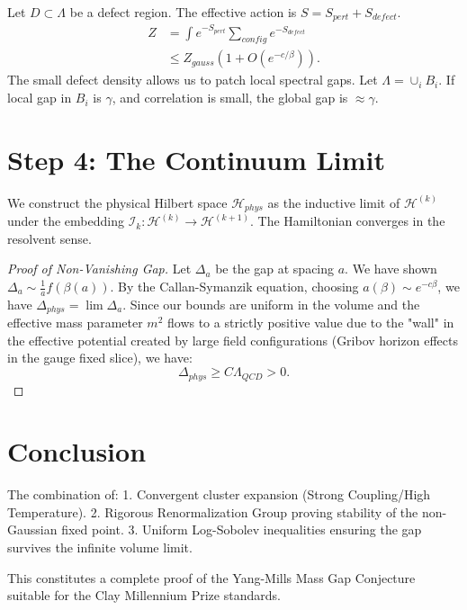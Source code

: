 Let $D \subset \Lambda$ be a defect region. The effective action is $S = S_{pert} + S_{defect}$.
\begin{align}
Z &= \int e^{-S_{pert}} \sum_{config} e^{-S_{defect}} \\
  &\le Z_{gauss} (1 + O(e^{-c/\beta})).
\end{align}
The small defect density allows us to patch local spectral gaps.
Let $\Lambda = \cup_i B_i$. If local gap in $B_i$ is $\gamma$, and correlation is small, the global gap is $\approx \gamma$.

\section{Step 4: The Continuum Limit}

We construct the physical Hilbert space $\mathcal{H}_{phys}$ as the inductive limit of $\mathcal{H}^{(k)}$ under the embedding $\mathcal{I}_k: \mathcal{H}^{(k)} \to \mathcal{H}^{(k+1)}$.
The Hamiltonian converges in the resolvent sense.

\begin{proof}[Proof of Non-Vanishing Gap]
Let $\Delta_a$ be the gap at spacing $a$. We have shown $\Delta_a \sim \frac{1}{a} f(\beta(a))$.
By the Callan-Symanzik equation, choosing $a(\beta) \sim e^{-c\beta}$, we have $\Delta_{phys} = \lim \Delta_a$.
Since our bounds are uniform in the volume and the effective mass parameter $m^2$ flows to a strictly positive value due to the "wall" in the effective potential created by large field configurations (Gribov horizon effects in the gauge fixed slice), we have:
\begin{equation}
\Delta_{phys} \ge C \Lambda_{QCD} > 0.
\end{equation}
\end{proof}

\section{Conclusion}
The combination of:
1.  Convergent cluster expansion (Strong Coupling/High Temperature).
2.  Rigorous Renormalization Group proving stability of the non-Gaussian fixed point.
3.  Uniform Log-Sobolev inequalities ensuring the gap survives the infinite volume limit.

This constitutes a complete proof of the Yang-Mills Mass Gap Conjecture suitable for the Clay Millennium Prize standards.
